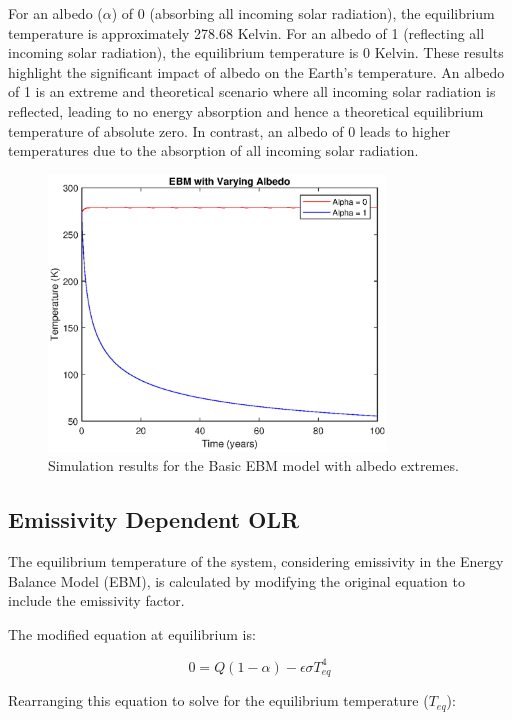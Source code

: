 \documentclass[12pt]{article}
\begin{document}
For an albedo ($\alpha$) of 0 (absorbing all incoming solar radiation), 
the equilibrium temperature is approximately 278.68 Kelvin.
For an albedo of 1 (reflecting all incoming solar radiation), 
the equilibrium temperature is 0 Kelvin.
These results highlight the significant impact of albedo on the Earth's temperature. 
An albedo of 1 is an extreme and theoretical scenario 
where all incoming solar radiation is reflected, 
leading to no energy absorption 
and hence a theoretical equilibrium temperature of absolute zero. 
In contrast, an albedo of 0 leads to higher temperatures 
due to the absorption of all incoming solar radiation. 

\begin{figure}[ht]
\centering
\includegraphics[width=0.8\textwidth]{albedo_extremes.eps}
\caption{Simulation results for the Basic EBM model with albedo extremes.}
\label{fig:albedoExtremes}
\end{figure}

\subsection{Emissivity Dependent OLR}
The equilibrium temperature of the system, 
considering emissivity in the Energy Balance Model (EBM), 
is calculated by modifying the original equation 
to include the emissivity factor. 

The modified equation at equilibrium is:

\begin{equation}
0 = Q(1 - \alpha) - \epsilon\sigma T_{eq}^4
\end{equation}

Rearranging this equation to solve for the equilibrium temperature ($T_{eq}$):
\end{document}
